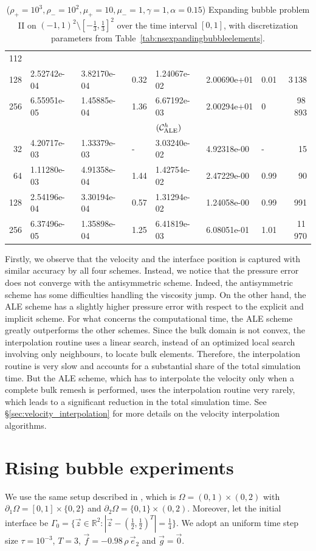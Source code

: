 \documentclass[a4paper,12pt,onecolumn]{article}
\newcommand{\R}{\mathbb R}
\newcommand{\schemeALE}{{\mathcal{C}^h_{\rm ALE}}}
\begin{document}
\begin{table}
\begin{tabular}{rllllllr}
112 \\
128 & 2.52742e-04 & 3.82170e-04 & 0.32 & 1.24067e-02 & 2.00690e+01 & 0.01 &
3\,138 \\
256 & 6.55951e-05 & 1.45885e-04 & 1.36 & 6.67192e-03 & 2.00294e+01 &    0 &
98\,893 \\
\hline
& \multicolumn{7}{c}{$(\schemeALE)$} \\
\hline
 32 & 4.20717e-03 & 1.33379e-03 &    - & 3.03240e-02 & 4.92318e-00 &    - &
15 \\
 64 & 1.11280e-03 & 4.91358e-04 & 1.44 & 1.42754e-02 & 2.47229e-00 & 0.99 &
90 \\
128 & 2.54196e-04 & 3.30194e-04 & 0.57 & 1.31294e-02 & 1.24058e-00 & 0.99 &
991 \\
256 & 6.37496e-05 & 1.35898e-04 & 1.25 & 6.41819e-03 & 6.08051e-01 & 1.01 &
11\,970 \\
\hline
\end{tabular}
\hspace*{-3.25cm}
\caption[Navier--Stokes expanding bubble II errors]
{($\rho_+ = 10^3,\rho_- = 10^2,\mu_+ = 10,\mu_- =1,\gamma = 1,\alpha=0.15$)
Expanding bubble problem II on $(-1,1)^2\setminus[-\frac{1}{3},\frac{1}{3}]^2$
over the time interval $[0,1]$, with discretization parameters from
Table~\ref{tab:nsexpandingbubbleelements}.}
\label{tab:nsexpandingbubbleIIp2p1p0}
\end{table}
Firstly, we observe that the velocity and the interface position is captured
with similar accuracy by all four schemes. Instead, we notice that the
pressure error does not converge with the antisymmetric scheme. Indeed, the
antisymmetric scheme has some difficulties handling the viscosity jump. On the
other hand, the ALE scheme has a slightly higher pressure error with respect
to the explicit and implicit scheme. For what concerns the computational time,
the ALE scheme greatly outperforms the other schemes. Since the bulk domain is
not convex, the interpolation routine uses a linear search, instead of an
optimized local search involving only neighbours, to locate bulk elements.
Therefore, the interpolation routine is very slow and accounts for a
substantial share of the total simulation time. But the ALE scheme, which has
to interpolate the velocity only when a complete bulk remesh is performed, uses
the interpolation routine very rarely, which leads to a significant reduction
in the total simulation time. See \S\ref{sec:velocity_interpolation} for more
details on the velocity interpolation algorithms.

\section{Rising bubble experiments}\label{sec:2d_rising_bubble_results}
We use the same  setup described in \cite[Figure~2]{HysingTKPBGT09}, which is
$\Omega = (0,1) \times (0,2)$ with $\partial_1\Omega = [0,1] \times \{0,2\}$
and $\partial_2\Omega = \{0,1\} \times (0,2)$. Moreover, let the initial
interface be $\Gamma_0 = \{\vec z \in \R^2 : |\vec z - (\tfrac{1}{2},
\tfrac{1}{2})^T| = \frac{1}{4}\}$.  We adopt an uniform time step size
$\tau=10^{-3}$, $T=3$, $\vec f = -0.98\,\rho\,\vec e_2$ and $\vec g=\vec 0$.
\end{document}

